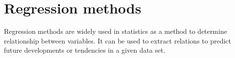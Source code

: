 \section{Regression methods} \label{sec:regression}

	

Regression methods are widely used in statistics as a method to determine relationship between variables. It can be used to extract relations to predict future developments or tendencies in a given data set. 

%
%
%


